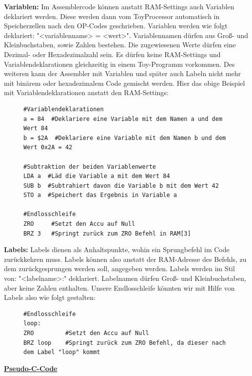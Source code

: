 \documentclass{article}
\begin{document}
\normalsize

\noindent \textbf{Variablen:} Im Assemblercode können anstatt RAM-Settings
auch Variablen deklariert werden. Diese werden dann vom ToyProcessor automatisch
in Speicherzellen nach den OP-Codes geschrieben. Variablen werden wie folgt
deklariert: "<variablenname> = <wert>".
Variablennamen dürfen aus Groß- und Kleinbuchstaben, sowie Zahlen bestehen.
Die zugewiesenen Werte dürfen eine Dezimal- oder Hexadezimalzahl sein.
Es dürfen keine RAM-Settings und Variablendeklarationen gleichzeitig in einem Toy-Programm
vorkommen. Des weiteren kann der Assembler mit Variablen und später auch Labeln
nicht mehr mit binärem oder hexadezimalem Code gemischt werden.
Hier das obige Beispiel mit Variablendeklarationen anstatt den RAM-Settings:
\begin{figure}[h!]
\begin{lstlisting}
#Variablendeklarationen
a = 84  #Deklariere eine Variable mit dem Namen a und dem Wert 84
b = $2A  #Deklariere eine Variable mit dem Namen b und dem Wert 0x2A = 42

#Subtraktion der beiden Variablenwerte
LDA a  #Läd die Variable a mit dem Wert 84
SUB b  #Subtrahiert davon die Variable b mit dem Wert 42
STO a  #Speichert das Ergebnis in Variable a

#Endlosschleife
ZRO     #Setzt den Accu auf Null
BRZ 3   #Springt zurück zum ZRO Befehl in RAM[3]
\end{lstlisting}
\end{figure}

\noindent \textbf{Labels:} Labels dienen als Anhaltspunkte, wohin ein
Sprungbefehl im Code zurückkehren muss. Labels können also anstatt der
RAM-Adresse des Befehls, zu dem zurückgesprungen werden soll, angegeben werden.
Labels werden im Stil von: "<labelname>:"
deklariert. Labelnamen dürfen Groß- und Kleinbuchstaben, aber keine Zahlen
enthalten. Unsere Endlosschleife könnten wir mit Hilfe von Labels also
wie folgt gestalten:
\begin{figure}[h!]
\begin{lstlisting}
#Endlosschleife
loop:
ZRO         #Setzt den Accu auf Null
BRZ loop    #Springt zurück zum ZRO Befehl, da dieser nach dem Label "loop" kommt
\end{lstlisting}
\end{figure}

\newpage
\vspace{-5cm}
\noindent \large \underline{\textbf{Pseudo-C-Code}}\\
\end{document}
